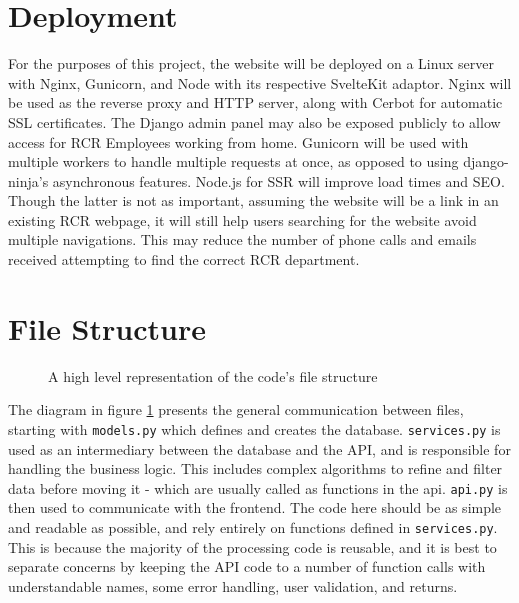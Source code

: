 \section{Deployment}
For the purposes of this project, the website will be deployed on a Linux server with Nginx, Gunicorn, and Node with its respective SvelteKit adaptor. Nginx will be used as the reverse proxy and HTTP server, along with Cerbot for automatic SSL certificates. The Django admin panel may also be exposed publicly to allow access for RCR Employees working from home. Gunicorn will be used with multiple workers to handle multiple requests at once, as opposed to using django-ninja's asynchronous features. Node.js for SSR will improve load times and SEO. Though the latter is not as important, assuming the website will be a link in an existing RCR webpage, it will still help users searching for the website avoid multiple navigations. This may reduce the number of phone calls and emails received attempting to find the correct RCR department.


\section{File Structure} \label{File Structure}
\begin{figure}[h]
\centering
{}
\vspace{-20pt}
\caption{A high level representation of the code's file structure}
\label{fig:file-design}
\vspace{-5pt}
\end{figure}
The diagram in figure \ref{fig:file-design} presents the general communication between files, starting with \texttt{models.py} which defines and creates the database. \texttt{services.py} is used as an intermediary between the database and the API, and is responsible for handling the business logic. This includes complex algorithms to refine and filter data before moving it - which are usually called as functions in the api. \texttt{api.py} is then used to communicate with the frontend. The code here should be as simple and readable as possible, and rely entirely on functions defined in \texttt{services.py}. This is because the majority of the processing code is reusable, and it is best to separate concerns by keeping the API code to a number of function calls with understandable names, some error handling, user validation, and returns.

